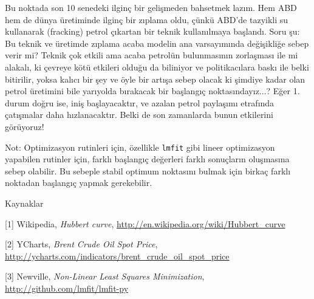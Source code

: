 \documentclass[12pt,fleqn]{article}\usepackage{../../common}
\begin{document}
Bu noktada son 10 senedeki ilginç bir gelişmeden bahsetmek lazım. Hem ABD
hem de dünya üretiminde ilginç bir zıplama oldu, çünkü ABD'de tazyikli su
kullanarak (fracking) petrol çıkartan bir teknik kullanılmaya
başlandı. Soru şu: Bu teknik ve üretimde zıplama acaba modelin ana
varsayımında değişikliğe sebep verir mi? Teknik çok etkili ama acaba
petrolün bulunmasının zorlaşması ile mi alakalı, ki çevreye kötü etkileri
olduğu da biliniyor ve politikacılara baskı ile belki bitirilir, yoksa
kalıcı bir şey ve öyle bir artışa sebep olacak ki şimdiye kadar olan petrol
üretimini bile yarıyolda bırakacak bir başlangıç noktasındayız...?  Eğer
1. durum doğru ise, iniş başlayacaktır, ve azalan petrol paylaşımı
etrafında çatışmalar daha hızlanacaktır. Belki de son zamanlarda bunun
etkilerini görüyoruz!

Not: Optimizasyon rutinleri için, özellikle \verb!lmfit! gibi lineer
optimizasyon yapabilen rutinler için, farklı başlangıç değerleri farklı
sonuçların oluşmasına sebep olabilir. Bu sebeple stabil optimum noktasını
bulmak için birkaç farklı noktadan başlangıç yapmak gerekebilir.

Kaynaklar

[1] Wikipedia, {\em Hubbert curve}, \url{http://en.wikipedia.org/wiki/Hubbert_curve}

[2] YCharts, {\em Brent Crude Oil Spot Price}, \url{http://ycharts.com/indicators/brent_crude_oil_spot_price}

[3] Newville, {\em Non-Linear Least Squares Minimization}, \url{http://github.com/lmfit/lmfit-py}
\end{document}
